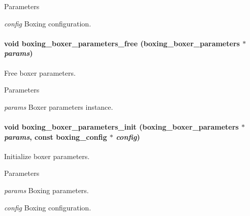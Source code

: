 \begin{DoxyParams}{Parameters}
\item[{\em config}]Boxing configuration. \end{DoxyParams}
\hypertarget{group__boxer_gac254af5ce8ee6a05f39869c70bad33e8}{
\paragraph[{boxing\_\-boxer\_\-parameters\_\-free}]{\setlength{\rightskip}{0pt plus 5cm}void boxing\_\-boxer\_\-parameters\_\-free ({\bf boxing\_\-boxer\_\-parameters} $\ast$ {\em params})}\hfill}
\label{group__boxer_gac254af5ce8ee6a05f39869c70bad33e8}
Free boxer parameters.


\begin{DoxyParams}{Parameters}
\item[{\em params}]Boxer parameters instance. \end{DoxyParams}
\hypertarget{group__boxer_ga28975734772cdb389c97d7adf3e9f156}{
\paragraph[{boxing\_\-boxer\_\-parameters\_\-init}]{\setlength{\rightskip}{0pt plus 5cm}void boxing\_\-boxer\_\-parameters\_\-init ({\bf boxing\_\-boxer\_\-parameters} $\ast$ {\em params}, \/  const {\bf boxing\_\-config} $\ast$ {\em config})}\hfill}
\label{group__boxer_ga28975734772cdb389c97d7adf3e9f156}
Initialize boxer parameters.


\begin{DoxyParams}{Parameters}
\item[{\em params}]Boxing parameters. \item[{\em config}]Boxing configuration. \end{DoxyParams}

